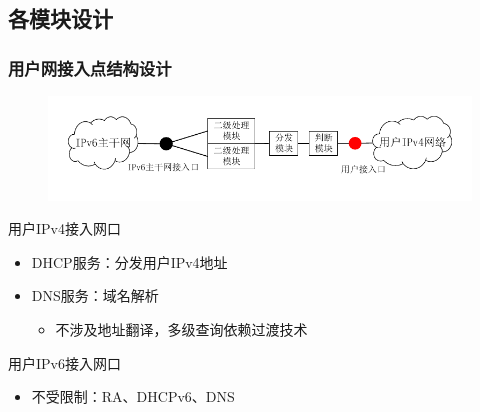 \documentclass{beamer}
\begin{document}
\subsection{各模块设计}
\begin{frame}
  \frametitle{用户网接入点结构设计}
  \begin{figure}
    \includegraphics[width=\textwidth]{figs/10-user-access-point-a.pdf}
  \end{figure}
  \vspace{-1em}

  \begin{block}{用户IPv4接入网口}
    \begin{itemize}
    \item DHCP服务：分发用户IPv4地址
    \item DNS服务：域名解析
      \begin{itemize}
      \item 不涉及地址翻译，多级查询依赖过渡技术
      \end{itemize}
    \end{itemize}
  \end{block}

  \begin{block}{用户IPv6接入网口}
    \begin{itemize}
    \item 不受限制：RA、DHCPv6、DNS
    \end{itemize}
  \end{block}
\end{frame}
\end{document}
